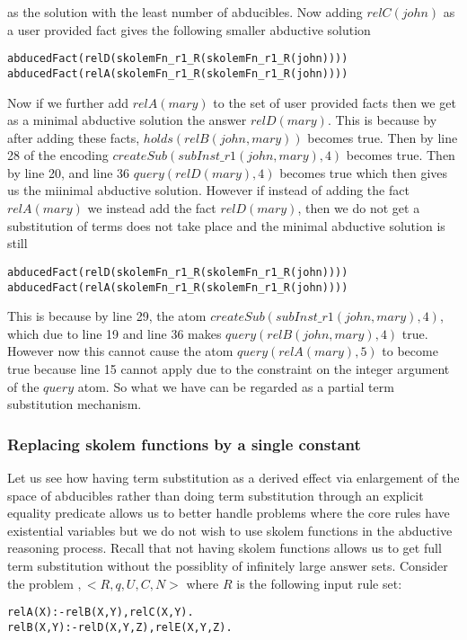 \documentclass[sigconf]{acmart}
\begin{document}
as the solution with the least number of abducibles.
Now adding $relC(john)$ as a user provided fact gives the following smaller abductive solution
\begin{verbatim}
abducedFact(relD(skolemFn_r1_R(skolemFn_r1_R(john))))
abducedFact(relA(skolemFn_r1_R(skolemFn_r1_R(john))))    
\end{verbatim}
Now if we further add $relA(mary)$ to the set of user provided facts then we
get as a minimal abductive solution the answer $relD(mary)$. This is because
by after adding these facts, $holds(relB(john,mary))$ becomes true. Then by
line 28 of the encoding   $createSub(subInst\_r1(john,mary),4)$ becomes
true. Then by line 20, and line 36 $query(relD(mary),4)$ becomes true which
then gives us the miinimal abductive solution. However if instead of adding
the fact $relA(mary)$ we instead add the fact $relD(mary)$, then we do not get
a  substitution of terms does not take place and the minimal abductive
solution is still
\begin{verbatim}
abducedFact(relD(skolemFn_r1_R(skolemFn_r1_R(john))))
abducedFact(relA(skolemFn_r1_R(skolemFn_r1_R(john))))    
\end{verbatim} 
This is because by line 29, the atom $createSub(subInst\_r1(john,mary),4)$,
which due to line 19 and line 36 makes $query(relB(john,mary),4)$
true. However now this cannot cause the atom $query(relA(mary),5)$ to become
true because line 15 cannot apply due to the constraint on the integer
argument of the $query$ atom. So what we have can be regarded as a partial
term substitution mechanism.


\subsubsection{Replacing skolem functions by a single constant}

Let us see how having term substitution as a derived effect via enlargement of
the space of abducibles rather than doing term substitution through an
explicit equality predicate allows us to better handle problems where the core
rules have existential variables but we do not wish to use skolem functions in
the abductive reasoning process. Recall that not having skolem functions
allows us to get full term substitution without the possiblity of infinitely
large answer sets. Consider the problem $,<R,q,U,C,N>$ where $R$ is the
following input rule set: 

\begin{verbatim}
relA(X):-relB(X,Y),relC(X,Y).
relB(X,Y):-relD(X,Y,Z),relE(X,Y,Z).
\end{verbatim}
\end{document}
